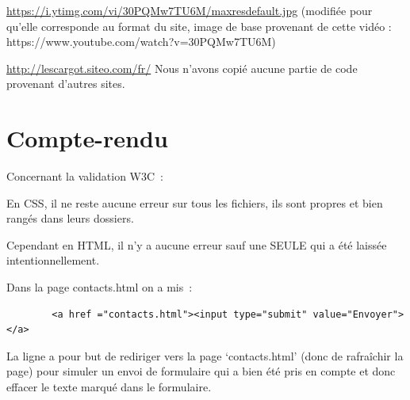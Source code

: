\documentclass[12pt]{article}
\begin{document}
{\begin{adjustwidth}{20pt}{20pt}
    \url{https://i.ytimg.com/vi/30PQMw7TU6M/maxresdefault.jpg} \linebreak
    (modifiée pour qu’elle corresponde au format du site, image de base provenant de cette vidéo : 
    https://www.youtube.com/watch?v=30PQMw7TU6M) \bigskip
    
    \url{http://lescargot.siteo.com/fr/} \linebreak 
    \bigskip
    Nous n’avons copié aucune partie de code provenant d’autres sites.

    \section{Compte-rendu}
    Concernant la validation W3C : \bigskip

    En CSS, il ne reste aucune erreur sur tous les fichiers, ils sont propres et bien rangés dans leurs dossiers.\bigskip
    
    Cependant en HTML, il n’y a aucune erreur sauf une SEULE qui a été laissée intentionnellement.\bigskip
    
    Dans la page contacts.html on a mis : \bigskip
    
    \begin{verbatim}
        <a href ="contacts.html"><input type="submit" value="Envoyer"></a>
    \end{verbatim}
    
    La ligne a pour but de rediriger vers la page ‘contacts.html’ (donc de rafraîchir la page) pour simuler un envoi de formulaire qui a bien été pris en compte et donc effacer le texte marqué dans le formulaire.
    \end{adjustwidth}
    }
\end{document}
